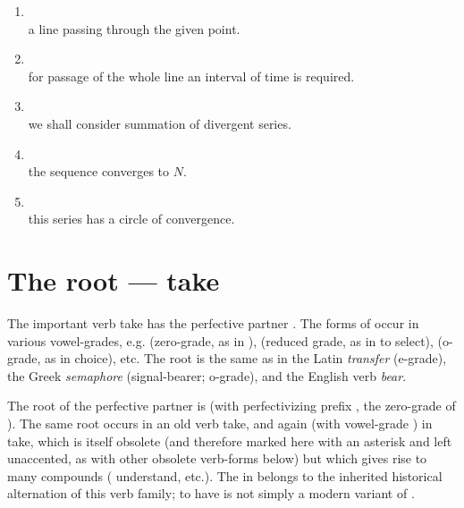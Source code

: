 \begin{enumerate}[label=\arabic*)]
      it is necessary to use a more complicated definition.
\item {}\\
      a line passing through the given point.
\item {}\\
      for passage of the whole line an interval of time is required.
\item {}\\
      we shall consider summation of divergent series.
\item {}\\
      the sequence converges to $N$.
\item {}\\
      this series has a circle of convergence.
\end{enumerate}

\section{The root  --- take}

The important verb  take has the perfective partner . The forms of  occur in various vowel-grades, e.g.  (zero-grade, as in ),  (reduced grade, as in  to select),  (o-grade, as in  choice), etc. The root is the same as in the Latin \emph{transfer} (e-grade), the Greek \emph{semaphore} (signal-bearer; o-grade), and the English verb \emph{bear}.

The root of the perfective partner  is  (with perfectivizing prefix , the zero-grade of ). The same root occurs in an old verb  take, and again (with vowel-grade ) in  take, which is itself obsolete (and therefore marked here with an asterisk and left unaccented, as with other obsolete verb-forms below) but which gives rise to many compounds ( understand, etc.). The  in  belongs to the inherited historical alternation of this verb family;  to have is not simply a modern variant of .

